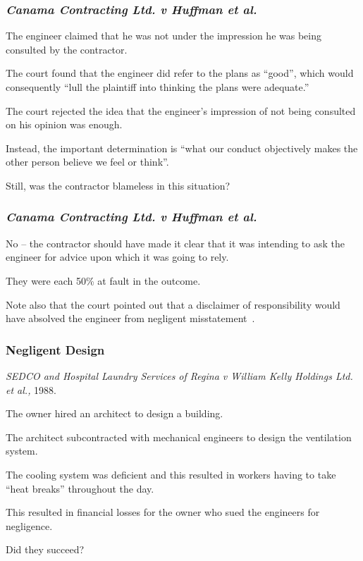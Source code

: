 \begin{frame}
\frametitle{\textit{Canama Contracting Ltd. v Huffman et al.}}

The engineer claimed that he was not under the impression he was being consulted by the contractor.


The court found that the engineer did refer to the plans as ``good'', which would consequently ``lull the plaintiff into thinking the plans were adequate.''

The court rejected the idea that the engineer's impression of not being consulted on his opinion was enough.

Instead, the important determination is ``what our conduct objectively makes the other person believe we feel or think''.

Still, was the contractor blameless in this situation?

\end{frame}



\begin{frame}
\frametitle{\textit{Canama Contracting Ltd. v Huffman et al.}}

No -- the contractor should have made it clear that it was intending to ask the engineer for advice upon which it was going to rely.

They were each 50\% at fault in the outcome.

Note also that the court pointed out that a disclaimer of responsibility would have absolved the engineer from negligent misstatement~\cite{lpe}.

\end{frame}



\begin{frame}
\frametitle{Negligent Design}

\textit{SEDCO and Hospital Laundry Services of Regina v William Kelly Holdings Ltd. et al.,} 1988.


The owner hired an architect to design a building.

The architect subcontracted with mechanical engineers to design the ventilation system.

The cooling system was deficient and this resulted in workers having to take ``heat breaks'' throughout the day.

This resulted in financial losses for the owner who sued the engineers for negligence.

Did they succeed?

\end{frame}



